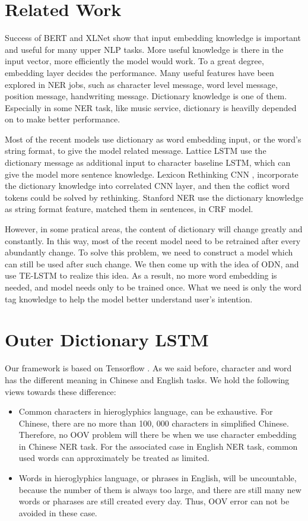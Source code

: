 \documentclass[letterpaper]{article} %
\begin{document}
\section{Related Work}
Success of BERT \cite{bert} and XLNet \cite{xlnet} show that input embedding knowledge is important and useful for many upper NLP tasks. More useful knowledge is there in the input vector, more efficiently the model would work. To a great degree, embedding layer decides the performance. Many useful features have been explored in NER jobs, such as character level message, word level message, position message, handwriting message. Dictionary knowledge is one of them. Especially in some NER task, like music service, dictionary is heavilly depended on to make better performance. 

Most of the recent models use dictionary as word embedding input, or the word's string format, to give the model related message. Lattice LSTM \cite{lattice}  use the dictionary message as additional input to character baseline LSTM, which can give the model more sentence knowledge. Lexicon Rethinking CNN \cite{lrcnn}, incorporate the dictionary knowledge into correlated CNN layer, and then the coflict word tokens could be solved by rethinking. Stanford NER \cite{stner} use the dictionary knowledge as string format feature, matched them in sentences, in CRF model.

However, in some pratical areas, the content of dictionary will change greatly and constantly. In this way, most of the recent model need to be retrained after every abundantly change. To solve this problem, we need to construct a model which can still be used after such change. We then come up with the idea of ODN, and use TE-LSTM to realize this idea. As a result, no more word embedding is needed, and model needs only to be trained once.  What we need is only the word tag knowledge to help the model better understand user's intention.

\section{Outer Dictionary LSTM}

Our framework is based on Tensorflow \cite{tensor}. As we said before, character and word has the different meaning in Chinese and English tasks. We hold the following views towards these difference: 

\begin{itemize}
\item Common characters in hieroglyphics language, can be exhaustive. For Chinese, there are no more than 100, 000 characters in simplified Chinese. Therefore, no OOV problem will there be when we use character embedding in Chinese NER task. For the associated case in English NER task, common used words can approximately be treated as limited.
\item Words in hieroglyphics language, or phrases in English, will be uncountable, because the number of them is always too large, and there are still many new words or pharases are still created every day. Thus, OOV error can not be avoided in these case.
\end{itemize}
\end{document}
